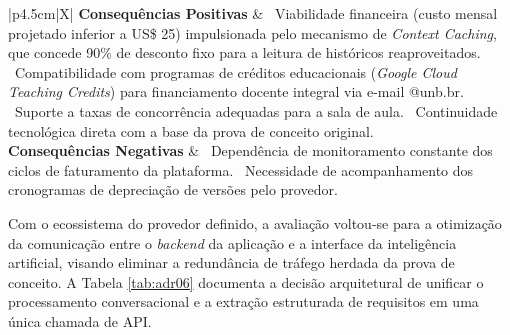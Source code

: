 {\begin{xltabular}{\textwidth}{|p{4.5cm}|X|}
    \midrule
    \textbf{Consequências Positivas} & 
    \textbullet~Viabilidade financeira (custo mensal projetado inferior a US\$ 25) impulsionada pelo mecanismo de \textit{Context Caching}, que concede 90\% de desconto fixo para a leitura de históricos reaproveitados. \newline
    \textbullet~Compatibilidade com programas de créditos educacionais (\textit{Google Cloud Teaching Credits}) para financiamento docente integral via e-mail @unb.br. \newline
    \textbullet~Suporte a taxas de concorrência adequadas para a sala de aula. \newline
    \textbullet~Continuidade tecnológica direta com a base da prova de conceito original. \\
    \midrule
    \textbf{Consequências Negativas} & 
    \textbullet~Dependência de monitoramento constante dos ciclos de faturamento da plataforma. \newline
    \textbullet~Necessidade de acompanhamento dos cronogramas de depreciação de versões pelo provedor. \\
\end{xltabular}
}

Com o ecossistema do provedor definido, a avaliação voltou-se para a otimização da comunicação entre o \textit{backend} da aplicação e a interface da inteligência artificial, visando eliminar a redundância de tráfego herdada da prova de conceito. A Tabela \ref{tab:adr06} documenta a decisão arquitetural de unificar o processamento conversacional e a extração estruturada de requisitos em uma única chamada de API.

